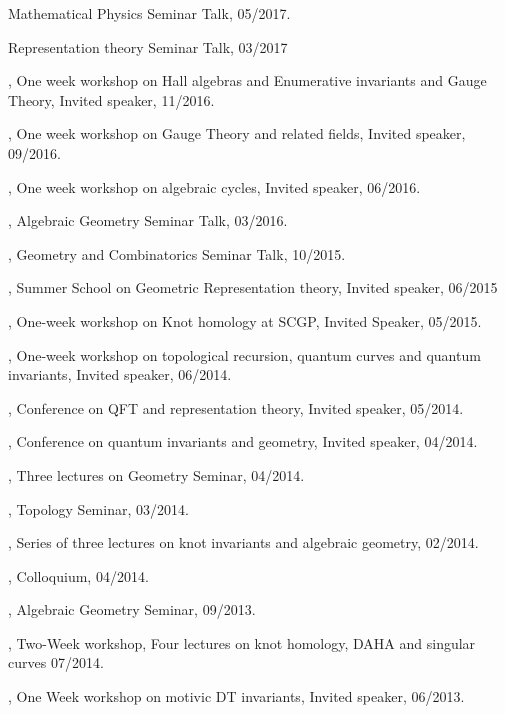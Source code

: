 \documentclass[11pt]{amsart}
\theoremstyle{plain}
\theoremstyle{definition}
\theoremstyle{remark}
\begin{document}
 Mathematical Physics Seminar Talk, 05/2017.

 Representation theory Seminar Talk, 03/2017

, One week workshop on Hall algebras and Enumerative invariants and Gauge Theory, Invited speaker, 11/2016.

, One week workshop on Gauge Theory and related fields, Invited speaker, 09/2016.

, One week workshop on algebraic cycles, Invited speaker, 06/2016.

, Algebraic Geometry Seminar Talk, 03/2016.


, Geometry and Combinatorics Seminar Talk, 10/2015.

, Summer School on Geometric Representation theory, Invited speaker, 06/2015

, One-week workshop on Knot homology at SCGP, Invited Speaker, 05/2015. 

,  One-week workshop on topological recursion, quantum curves and quantum invariants, Invited speaker, 06/2014. 

, Conference on QFT and representation theory, Invited speaker, 05/2014.

, Conference on quantum invariants and geometry, Invited speaker, 04/2014.

, Three lectures on Geometry Seminar, 04/2014.

, Topology Seminar, 03/2014.

, Series of three lectures on knot invariants and algebraic geometry, 02/2014.

, Colloquium, 04/2014.

, Algebraic Geometry Seminar, 09/2013.

, Two-Week workshop, Four lectures on knot homology, DAHA and singular curves 07/2014.

, {One Week workshop on motivic DT invariants}, Invited speaker, 06/2013.
\end{document}
